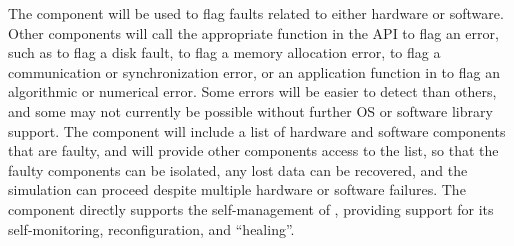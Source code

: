\documentclass[11pt,letterpaper]{article}
\begin{document}
The  component will be used to flag faults related to
either hardware or software.  Other components will call the
appropriate function in the  API to flag an error, such as
 to flag a disk fault,  to flag a memory
allocation error,  to flag a communication or
synchronization error, or an application function in  to
flag an algorithmic or numerical error.  Some errors will be easier to
detect than others, and some may not currently be possible without
further OS or software library support.  The  component
will include a list of hardware and software components that are
faulty, and will provide other components access to the list, so that
the faulty components can be isolated, any lost data can be recovered,
and the simulation can proceed despite multiple hardware or software
failures.  The  component directly supports the self-management
of \cello, providing support for its self-monitoring, reconfiguration,
and ``healing''.

\end{document}
